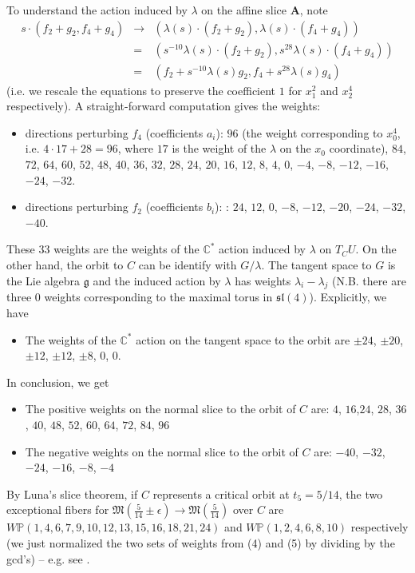 \documentclass[11pt]{amsart}
\numberwithin{equation}{section}
\theoremstyle{plain}
\theoremstyle{remark}
\theoremstyle{definition}
\newcommand{\bP}{\mathbb{P}}
\newcommand{\bC}{\mathbb{C}}
\newcommand{\gM}{\mathfrak{M}}
\begin{document}
 To understand the action induced by $\lambda$ on the affine slice $\mathbf A$, note
 \begin{eqnarray}
 s\cdot(f_2+g_2,f_4+g_4)&\to&\left(\lambda(s)\cdot(f_2+g_2),\lambda(s)\cdot(f_4+g_4)\right) \label{actionslice}\\
 &=&\left(s^{-10}\lambda(s)\cdot(f_2+g_2),s^{28}\lambda(s)\cdot(f_4+g_4)\right)\nonumber\\
 &=&(f_2+s^{-10}\lambda(s)g_2, f_4+s^{28}\lambda(s)g_4)\nonumber
 \end{eqnarray}
 (i.e. we rescale the equations to preserve the coefficient $1$ for $x_1^2$ and $x_2^4$ respectively).  A straight-forward computation gives the weights: 
 \begin{itemize}
 \item[(1)] directions perturbing $f_4$ (coefficients $a_i$): $96$ (the weight corresponding to $x_0^4$,  i.e. $4\cdot 17+28=96$, where $17$ is the weight of the $\lambda$ on the $x_0$ coordinate), $84$, $72$, $64$, $60$, $52$, $48$, $40$, $36$, $32$, $28$, $24$, $20$, $16$, $12$, $8$, $4$, $0$, $-4$, $-8$, $-12$, $-16$, $-24$, $-32$.
 \item[(2)] directions perturbing $f_2$ (coefficients $b_i$): : $24$, $12$, $0$, $-8$, $-12$, $-20$, $-24$, $-32$, $-40$.
\end{itemize}
 These $33$ weights are the weights of the $\bC^*$ action induced by $\lambda$ on $T_{C}U$. 
On the other hand, the orbit to $C$ can be identify with $G/\lambda$. The tangent space to $G$ is the Lie algebra $\mathfrak{g}$ and the induced action by $\lambda$ has weights $\lambda_i-\lambda_j$ (N.B. there are three $0$ weights corresponding to the maximal torus in $\mathfrak{sl}(4)$). Explicitly, we have
\begin{itemize}
\item[(3)] The weights of the $\bC^*$ action on the tangent space to the orbit are  $\pm 24$, $\pm 20$, $\pm 12$, $\pm 12$, $\pm 8$, $0$, $0$.
\end{itemize}
In conclusion, we get
\begin{itemize}
\item[(4)] The positive weights on the normal slice to the orbit of $C$ are:  $4$, $16$,$24$, $28$, $36$, $40$, $48$, $52$, $60$, $64$, $72$, $84$, $96$
\item[(5)] The negative weights on the normal slice to the orbit of $C$ are:  $-40$, $-32$, $-24$, $-16$, $-8$, $-4$
\end{itemize}
By Luna's slice theorem, if $C$ represents a critical orbit at $t_5=5/14$, the two exceptional fibers for $\gM(\frac{5}{14}\pm \epsilon)\to \gM(\frac{5}{14})$ over $C$ are $W\bP(1,4,6,7,9,10,12,13,15,16,18,21,24)$ and $W\bP(1,2,4,6,8,10)$ respectively (we just normalized the two sets of weights from (4) and (5) by dividing by the gcd's) -- e.g. see \cite[\S4.2]{VGIT}. 
\end{document}
